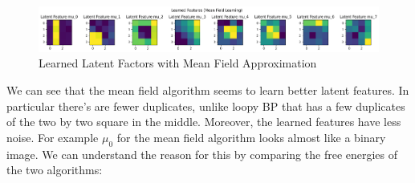 \documentclass[12pt]{article}
\begin{document}
\begin{figure}[h]
\centering
\includegraphics[scale=0.4]{outputs/q3/f-latent-factors}
\caption{Learned Latent Factors with Mean Field Approximation}
\label{fig:3f-latent-factors}
\end{figure}

We can see that the mean field algorithm seems to learn better latent features. In particular there's are fewer duplicates, unlike loopy BP that has a few duplicates of the two by two square in the middle. Moreover, the learned features have less noise. For example $\mu_0$ for the mean field algorithm looks almost like a binary image. We can understand the reason for this by comparing the free energies of the two algorithms:
\end{document}
